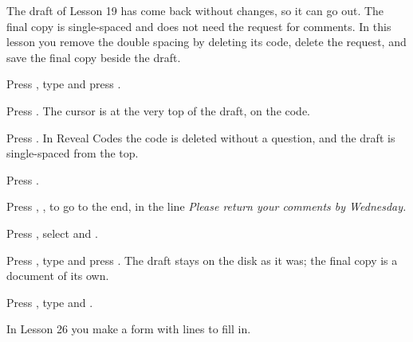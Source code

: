 The draft of Lesson 19 has come back without changes, so it can go out.  The
final copy is single-spaced and does not need the request for comments.  In
this lesson you remove the double spacing by deleting its code, delete the
request, and save the final copy beside the draft.

\begin{WPSteps}
\item Press , type  and press
.
\item Press .  The cursor is at the very top of
the draft, on the \Code{[Ln Spacing:2]} code.
\end{WPSteps}
\begin{WPSteps}[resume]
\item Press .  In Reveal Codes the code is deleted without a
question, and the draft is single-spaced from the top.
\item Press .
\end{WPSteps}

\begin{WPSteps}
\item Press , ,  to go to the end,
in the line \textit{Please return your comments by Wednesday.}
\item Press , select  and
.
\end{WPSteps}

\begin{WPSteps}
\item Press , type  and press
.  The draft stays on the disk as it was; the final copy is a
document of its own.
\item Press , type  and .
\end{WPSteps}
\EndReplay
In Lesson 26 you make a form with lines to fill in.

